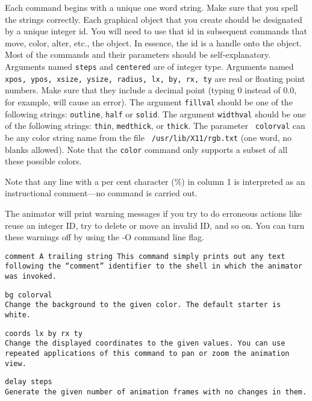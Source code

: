 Each command begins with a unique one word string.  Make sure that you
spell the strings correctly.  Each graphical object that you create
should be designated by a unique integer id.  You will need to use
that id in subsequent commands that move, color, alter, etc., the
object.  In essence, the id is a handle onto the object.  Most of the
commands and their parameters should be self-explanatory.  Arguments
named {\tt steps} and {\tt centered} are of integer type.  Arguments
named {\tt xpos, ypos, xsize, ysize, radius, lx, by, rx, ty} are real
or floating point numbers.  Make sure that they include a decimal
point (typing 0 instead of 0.0, for example, will cause an error).
The argument {\tt fillval} should be one of the following strings:
{\tt outline}, {\tt half} or {\tt solid}.  The argument {\tt widthval}
should be one of the following strings: {\tt thin}, {\tt medthick}, or
{\tt thick}.  The parameter {\tt
colorval} can be any color string name from the file {\tt
/usr/lib/X11/rgb.txt} (one word, no blanks allowed).  Note that the
{\tt color} command only supports a subset of all these possible
colors.

Note that any line with a per cent character (\%) in column 1 is
interpreted as an instructional comment---no command is carried out.

The animator will print warning messages if you try to do erroneous
actions like reuse an integer ID, try to delete or move an invalid ID,
and so on.  You can turn these warnings off by using the -O command
line flag.

\quest
\tt comment A trailing string
\hspace*{3ex} \rm This command simply prints out any text following the
``comment'' identifier to the shell in which the animator was invoked.

\quest
\tt bg colorval\\
\hspace*{3ex} \rm Change the background to the given color.  The
default starter is white. 

\quest
\tt coords lx by rx ty\\
\hspace*{3ex} \rm Change the displayed coordinates to the given
values.  You can use repeated applications of this command to pan or
zoom the animation view.

\quest
\tt delay steps\\
\hspace*{3ex} \rm Generate the given number of animation frames with
no changes in them.


